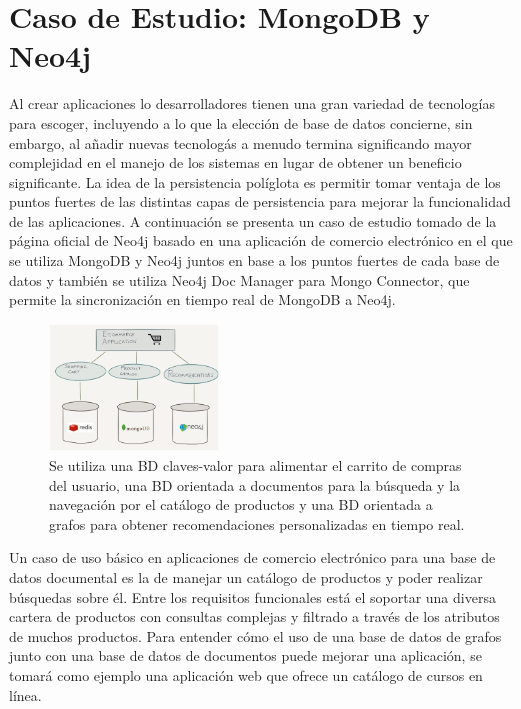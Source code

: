 \documentclass[conference]{IEEEtran}
\begin{document}
\section{Caso de Estudio: MongoDB y Neo4j}
Al crear aplicaciones lo desarrolladores tienen una gran variedad de tecnolog\'ias para escoger, incluyendo a lo que la elecci\'on de base de datos  concierne, sin embargo, al a\~nadir nuevas tecnolog\'as a menudo termina significando mayor complejidad en el manejo de los sistemas en lugar de obtener un beneficio significante. La idea de la persistencia pol\'iglota es permitir tomar ventaja de los puntos fuertes de las distintas capas de persistencia para mejorar la funcionalidad de las aplicaciones. A continuaci\'on se presenta un caso de estudio tomado de la p\'agina oficial de Neo4j \cite{caso} basado en una aplicaci\'on de comercio electr\'onico en el que se utiliza MongoDB y Neo4j juntos en base a los puntos fuertes de cada base de datos y tambi\'en se utiliza Neo4j Doc Manager para Mongo Connector, que permite la sincronizaci\'on en tiempo real de MongoDB a Neo4j.

\begin{figure}[!h]
\centering
\includegraphics[width=0.4\textwidth]{5}
\caption{Se utiliza una BD claves-valor para alimentar el carrito de compras del usuario, una BD orientada a  documentos para la b\'usqueda y la navegaci\'on por el cat\'alogo de productos y una BD orientada a grafos para obtener recomendaciones personalizadas en tiempo real.}
\label{fig5}
\end{figure}

Un caso de uso b\'asico en aplicaciones de comercio electr\'onico para una base de datos documental es la de manejar un cat\'alogo de productos y poder realizar b\'usquedas sobre \'el. Entre los requisitos funcionales está el soportar una diversa cartera de productos con consultas complejas y filtrado a trav\'es de los atributos de muchos productos. Para entender c\'omo el uso de una base de datos de grafos  junto con una base de datos de documentos puede mejorar una aplicaci\'on, se tomar\'a como ejemplo una aplicaci\'on web que ofrece un cat\'alogo de cursos en l\'inea.
\end{document}
